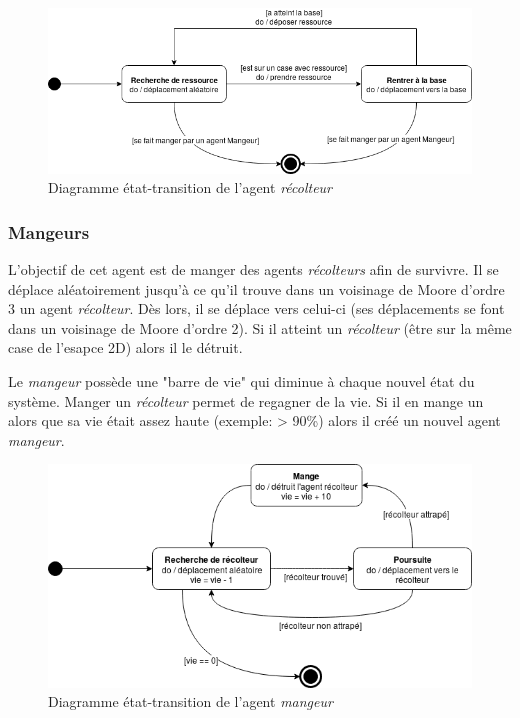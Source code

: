 \documentclass{article}
\begin{document}
\begin{figure}[!ht]
  \centering
  \caption{Diagramme état-transition de l'agent \emph{récolteur}}
  \includegraphics[scale=0.70]{img/etat-transition_recolteur.png}
\end{figure}

\subsubsection{Mangeurs}
L'objectif de cet agent est de manger des agents \emph{récolteurs} afin de survivre.
Il se déplace aléatoirement jusqu'à ce qu'il trouve dans un voisinage de Moore d'ordre 3
un agent \emph{récolteur}. Dès lors, il se déplace vers celui-ci (ses déplacements se
font dans un voisinage de Moore d'ordre 2). Si il atteint un \emph{récolteur} (être
sur la même case de l'esapce 2D) alors il le détruit.

Le \emph{mangeur} possède une "barre de vie" qui diminue à chaque nouvel état du système.
Manger un \emph{récolteur} permet de regagner de la vie. Si il en mange un alors que sa
vie était assez haute (exemple: > 90\%) alors il créé un nouvel agent \emph{mangeur}.

\begin{figure}[!ht]
  \centering
  \caption{Diagramme état-transition de l'agent \emph{mangeur}}
  \includegraphics[scale=0.70]{img/etat-transition_mangeur.png}
\end{figure}
\end{document}
